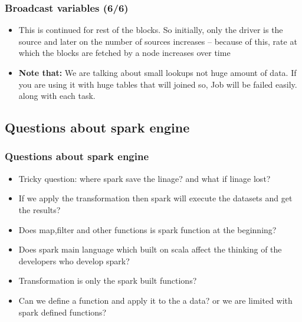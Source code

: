 \begin{frame}
	\frametitle{Broadcast variables (6/6)}
	\begin{itemize}[<+->]
		\item This is continued for rest of the blocks. So initially, only the driver is the source and later on the number of sources increases – because of this, rate at which the blocks are fetched by a node increases over time
		\item \textbf{Note that:} We are talking about small lookups not huge amount of data. If you are using it with huge tables that will joined so, Job will be failed easily. 
		along with each task.
	\end{itemize}
\end{frame}


%
%
%

\subsection{Questions about spark engine}
\begin{frame}
	  \frametitle{Questions about spark engine}
	\begin{itemize}[<+->]
		\item Tricky question: where spark save the linage? and what if linage lost?
		\item If we apply the transformation then spark will execute the datasets and get the results?
		\item Does map,filter and other functions is spark function at the beginning? 
		\item Does spark main language which built on scala affect the thinking of the developers who develop spark?
		\item Transformation is only the spark built functions?
		\item Can we define a function and apply it to the a data? or we are limited with spark defined functions?
	\end{itemize}
\end{frame}

%
%
%


